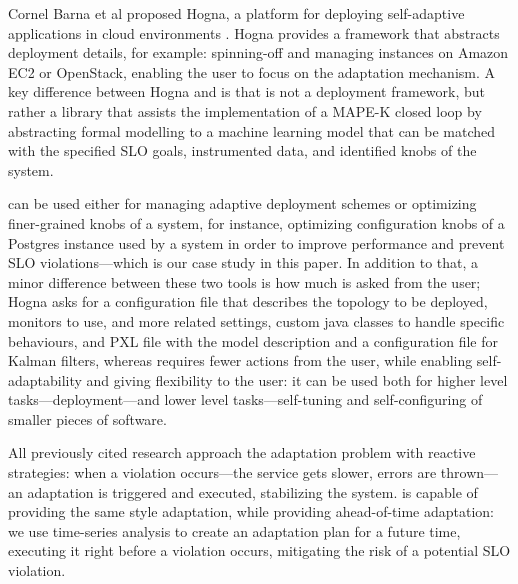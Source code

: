 Cornel Barna et al proposed Hogna, a platform for deploying self-adaptive applications in cloud environments \cite{barna_hogna:_2015}. Hogna provides a framework that abstracts deployment details, for example: spinning-off and managing instances on Amazon EC2 or OpenStack, enabling the user to focus on the adaptation mechanism. A key difference between Hogna and \projectname{} is that \projectname{} is not a deployment framework, but rather a library that assists the implementation of a MAPE-K closed loop by abstracting formal modelling to a machine learning model that can be matched with the specified SLO goals, instrumented data, and identified knobs of the system.

\projectname{} can be used either for managing adaptive deployment schemes or optimizing finer-grained knobs of a system, for instance, optimizing configuration knobs of a Postgres instance used by a system in order to improve performance and prevent SLO violations---which is our case study in this paper. In addition to that, a minor difference between these two tools is how much is asked from the user; Hogna asks for a configuration file that describes the topology to be deployed, monitors to use, and more related settings, custom java classes to handle specific behaviours, and PXL file with the model description and a configuration file for Kalman filters, whereas \projectname{} requires fewer actions from the user, while enabling self-adaptability and giving flexibility to the user: it can be used both for higher level tasks---deployment---and lower level tasks---self-tuning and self-configuring of smaller pieces of software.

All previously cited research approach the adaptation problem with reactive strategies: when a violation occurs---the service gets slower, errors are thrown---an adaptation is triggered and executed, stabilizing the system. \projectname{} is capable of providing the same style adaptation, while providing ahead-of-time adaptation: we use time-series analysis to create an adaptation plan for a future time, executing it right before a violation occurs, mitigating the risk of a potential SLO violation. 

